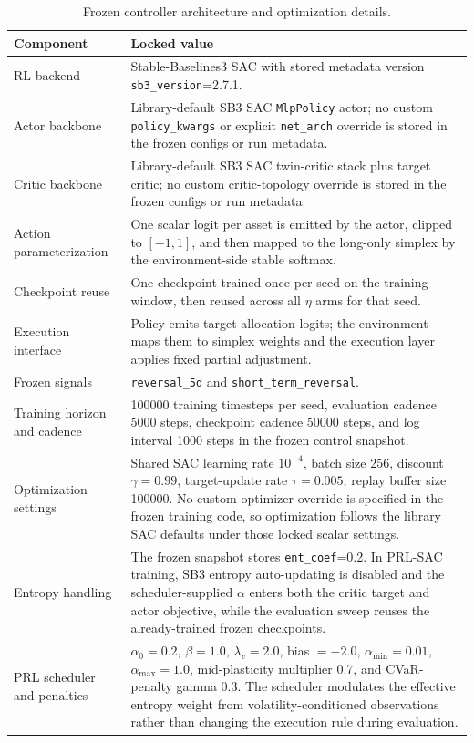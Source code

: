 \documentclass[10pt,twocolumn]{article}
\begin{document}
\begin{table}[t]
\centering
\small
\caption{Frozen controller architecture and optimization details.}
\label{tab:impl_controller}
\begin{tabular}{@{}p{}p{}@{}}
\toprule
Component & Locked value \\
\midrule
RL backend & Stable-Baselines3 SAC with stored metadata version \texttt{sb3\_version}=2.7.1. \\
Actor backbone & Library-default SB3 SAC \texttt{MlpPolicy} actor; no custom \texttt{policy\_kwargs} or explicit \texttt{net\_arch} override is stored in the frozen configs or run metadata. \\
Critic backbone & Library-default SB3 SAC twin-critic stack plus target critic; no custom critic-topology override is stored in the frozen configs or run metadata. \\
Action parameterization & One scalar logit per asset is emitted by the actor, clipped to $[-1,1]$, and then mapped to the long-only simplex by the environment-side stable softmax. \\
Checkpoint reuse & One checkpoint trained once per seed on the training window, then reused across all $\eta$ arms for that seed. \\
Execution interface & Policy emits target-allocation logits; the environment maps them to simplex weights and the execution layer applies fixed partial adjustment. \\
Frozen signals & \texttt{reversal\_5d} and \texttt{short\_term\_reversal}. \\
Training horizon and cadence & 100000 training timesteps per seed, evaluation cadence 5000 steps, checkpoint cadence 50000 steps, and log interval 1000 steps in the frozen control snapshot. \\
Optimization settings & Shared SAC learning rate $10^{-4}$, batch size 256, discount $\gamma=0.99$, target-update rate $\tau=0.005$, replay buffer size 100000. No custom optimizer override is specified in the frozen training code, so optimization follows the library SAC defaults under those locked scalar settings. \\
Entropy handling & The frozen snapshot stores \texttt{ent\_coef}=0.2. In PRL-SAC training, SB3 entropy auto-updating is disabled and the scheduler-supplied $\alpha$ enters both the critic target and actor objective, while the evaluation sweep reuses the already-trained frozen checkpoints. \\
PRL scheduler and penalties & $\alpha_0=0.2$, $\beta=1.0$, $\lambda_v=2.0$, bias $=-2.0$, $\alpha_{\min}=0.01$, $\alpha_{\max}=1.0$, mid-plasticity multiplier 0.7, and CVaR-penalty gamma 0.3. The scheduler modulates the effective entropy weight from volatility-conditioned observations rather than changing the execution rule during evaluation. \\

\end{tabular}
\end{table}
\end{document}
